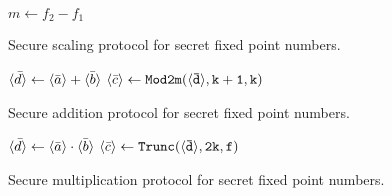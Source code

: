 \begin{center}
\begin{algorithm}[H]
\DontPrintSemicolon
$m \leftarrow f_2 - f_1$ \;
\caption{Secure scaling protocol for secret fixed point numbers.}
\label{alg:scale-sfix}
\end{algorithm}
\end{center}

\begin{center}
\begin{algorithm}[H]
\DontPrintSemicolon
$\langle \bar{d} \rangle \leftarrow \langle \bar{a} \rangle + \langle \bar{b} \rangle$ \;
$\langle \bar{c} \rangle \leftarrow \mathtt{Mod2m(\langle \bar{d} \rangle,k+1,k)}$ \;
\caption{Secure addition protocol for secret fixed point numbers.}
\label{alg:sfix-add}
\end{algorithm}
\end{center}

\begin{center}
\begin{algorithm}[H]
\DontPrintSemicolon
$\langle \bar{d} \rangle \leftarrow \langle \bar{a} \rangle \cdot \langle \bar{b} \rangle$ \;
$\langle \bar{c} \rangle \leftarrow \mathtt{Trunc(\langle \bar{d} \rangle,2k,f)}$ \;
\caption{Secure multiplication protocol for secret fixed point numbers.}
\label{alg:sfix-mult}
\end{algorithm}
\end{center}

